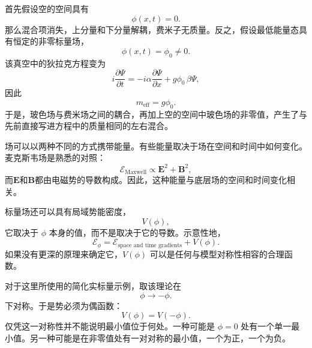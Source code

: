 首先假设空的空间具有
\begin{equation}
\phi(x,t)=0.
\end{equation}
那么混合项消失，上分量和下分量解耦，费米子无质量。反之，假设最低能量态具有恒定的非零标量场，
\begin{equation}
\phi(x,t)=\phi_0\neq0.
\end{equation}
该真空中的狄拉克方程变为
\begin{equation}
i\frac{\partial\Psi}{\partial t}
=
-i\alpha\frac{\partial\Psi}{\partial x}
+g\phi_0\,\beta\Psi,
\end{equation}
因此
\begin{equation}
m_{\mathrm{eff}}=g\phi_0.
\end{equation}
于是，玻色场与费米场之间的耦合，再加上空的空间中玻色场的非零值，产生了与先前直接写进方程中的质量相同的左右混合。

\begin{classroomqa}
\end{classroomqa}

\begin{classroomqa}
\end{classroomqa}

场可以以两种不同的方式携带能量。有些能量取决于场在空间和时间中如何变化。麦克斯韦场是熟悉的对照：
\begin{equation}
\mathcal{E}_{\mathrm{Maxwell}}\propto \mathbf E^2+\mathbf B^2,
\end{equation}
而\(\mathbf E\)和\(\mathbf B\)都由电磁势的导数构成。因此，这种能量与底层场的空间和时间变化相关。

标量场还可以具有局域势能密度，
\begin{equation}
V(\phi),
\end{equation}
它取决于 \(\phi\) 本身的值，而不是取决于它的导数。示意性地，
\begin{equation}
\mathcal{E}_\phi
=
\mathcal E_{\text{space and time gradients}}+V(\phi).
\end{equation}
如果没有更深的原理来确定它，\(V(\phi)\) 可以是任何与模型对称性相容的合理函数。

对于这里所使用的简化实标量示例，取该理论在
\begin{equation}
\phi\longrightarrow-\phi.
\end{equation}
下对称。于是势必须为偶函数：
\begin{equation}
V(\phi)=V(-\phi).
\end{equation}
仅凭这一对称性并不能说明最小值位于何处。一种可能是 \(\phi=0\) 处有一个单一最小值。另一种可能是在非零值处有一对对称的最小值，一个为正，一个为负。

